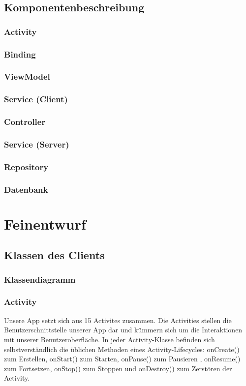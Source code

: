 \documentclass[a4paper]{scrreprt}
\begin{document}
	 \section{Komponentenbeschreibung}
		 \subsection{Activity}
		 \subsection{Binding}
		 \subsection{ViewModel}
	 	 \subsection{Service (Client)}
	 	 \subsection{Controller}
	 	 \subsection{Service (Server)}
	 	 \subsection{Repository}
	 	 \subsection{Datenbank}

        
\newpage

\chapter{Feinentwurf}
	\section{Klassen des Clients}
	\subsection{Klassendiagramm}
	
	 \subsection{Activity}
        Unsere App setzt sich aus 15 Activites zusammen. Die Activities stellen die Benutzerschnittstelle unserer App dar und kümmern sich um die Interaktionen mit unserer Benutzeroberfläche. In jeder Activity-Klasse befinden sich selbstverständlich die üblichen Methoden eines Activity-Lifecycles: onCreate() zum Erstellen, onStart() zum Starten, onPause() zum Pausieren , onResume() zum Fortsetzen, onStop() zum Stoppen und onDestroy() zum Zerstören der Activity.
	
	    
\end{document}
